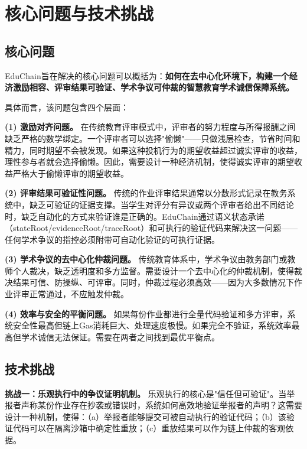 \documentclass[10.5pt,compsoc]{CjC}
\begin{document}
\section{核心问题与技术挑战}

\subsection{核心问题}

EduChain旨在解决的核心问题可以概括为：\textbf{如何在去中心化环境下，构建一个经济激励相容、评审结果可验证、学术争议可仲裁的智慧教育学术诚信保障系统。}

具体而言，该问题包含四个层面：

\textbf{(1) 激励对齐问题。} 在传统教育评审模式中，评审者的努力程度与所得报酬之间缺乏严格的数学绑定。一个评审者可以选择"偷懒"——只做浅层检查，节省时间和精力，同时期望不会被发现。如果这种投机行为的期望收益超过诚实评审的收益，理性参与者就会选择偷懒。因此，需要设计一种经济机制，使得诚实评审的期望收益严格大于偷懒评审的期望收益。

\textbf{(2) 评审结果可验证性问题。} 传统的作业评审结果通常以分数形式记录在教务系统中，缺乏可验证的证据支撑。当学生对评分有异议或两个评审者给出不同结论时，缺乏自动化的方式来验证谁是正确的。EduChain通过语义状态承诺（stateRoot/evidenceRoot/traceRoot）和可执行的验证代码来解决这一问题——任何学术争议的指控必须附带可自动化验证的可执行证据。

\textbf{(3) 学术争议的去中心化仲裁问题。} 传统教育体系中，学术争议由教务部门或教师个人裁决，缺乏透明度和多方监督。需要设计一个去中心化的仲裁机制，使得裁决结果可信、防操纵、可评审。同时，仲裁过程必须高效——因为大多数情况下作业评审正常通过，不应触发仲裁。

\textbf{(4) 效率与安全的平衡问题。} 如果每份作业都进行全量代码验证和多方评审，系统安全性最高但链上Gas消耗巨大、处理速度极慢。如果完全不验证，系统效率最高但学术诚信无法保证。需要在两者之间找到最优平衡点。

\subsection{技术挑战}

\textbf{挑战一：乐观执行中的争议证明机制。} 乐观执行的核心是"信任但可验证"。当举报者声称某份作业存在抄袭或错误时，系统如何高效地验证举报者的声明？这需要设计一种机制，使得：（a）举报者能够提交可被自动执行的验证代码；（b）该验证代码可以在隔离沙箱中确定性重放；（c）重放结果可以作为链上仲裁的客观依据。
\end{document}
